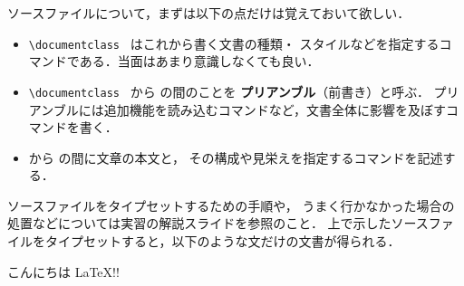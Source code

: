 ソースファイルについて，まずは以下の点だけは覚えておいて欲しい．

\begin{itemize}
\item \verb|\documentclass | はこれから書く文書の種類・
スタイルなどを指定するコマンドである．当面はあまり意識しなくても良い．
\item \verb|\documentclass | から \verb|| の間のことを
\textbf{プリアンブル}（前書き）と呼ぶ．
プリアンブルには追加機能を読み込むコマンドなど，文書全体に影響を及ぼすコマンドを書く．
\item \verb|| から \verb|| の間に文章の本文と，
その構成や見栄えを指定するコマンドを記述する．

\end{itemize}

ソースファイルをタイプセットするための手順や，
うまく行かなかった場合の処置などについては実習の解説スライドを参照のこと．
上で示したソースファイルをタイプセットすると，以下のような文だけの文書が得られる．

\begin{screen}
こんにちは \LaTeX !!
\end{screen}

